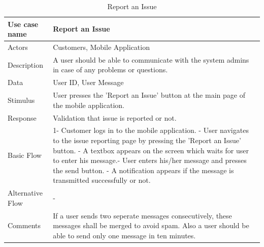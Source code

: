 \documentclass[11pt]{article}
\begin{document}
        \begin{table}[H]
            \begin{centering}
            \begin{tabular}{|p{2.5cm}|p{12cm}|}
            \hline
            Use case name & Report an Issue  \\ \hline
            Actors        & Customers, Mobile Application \\ \hline
            Description   & A user should be able to communicate with the system admins in case of any problems or questions.\\ \hline
            Data          & User ID, User Message \\ \hline
            Stimulus      & User presses the 'Report an Issue' button at the main page of the mobile application. \\ \hline
            Response      & Validation that issue is reported or not.  \\ \hline
            Basic Flow    & 
            1- Customer logs in to the mobile application. \newline
            2- User navigates to the issue reporting page by pressing the 'Report an Issue' button. \newline
            3- A textbox appears on the screen which waits for user to enter his message.\newline
            4- User enters his/her message and presses the send button. \newline
            5- A notification appears if the message is transmitted successfully or not. \\ \hline
            Alternative
                Flow      & - \\ \hline
            Comments      & If a user sends two seperate messages consecutively, these messages shall be merged to avoid spam. Also a user 
                            should be able to send only one message in ten minutes. \\ \hline
        \end{tabular}
        \caption{Report an Issue}
        \label{tab_13}
        \end{centering}
        \end{table}    
\end{document}
